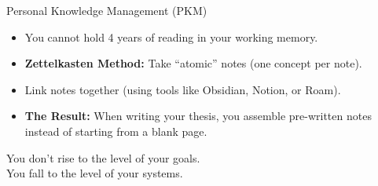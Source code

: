 \documentclass[aspectratio=169]{beamer}
\begin{document}
\begin{frame}{Personal Knowledge Management (PKM)}
  \begin{itemize}
    \item You cannot hold 4 years of reading in your working memory.
    \item \textbf{Zettelkasten Method:} Take ``atomic'' notes (one concept per note).
    \item Link notes together (using tools like Obsidian, Notion, or Roam).
    \item \textbf{The Result:} When writing your thesis, you assemble pre-written notes instead of starting from a blank page.
  \end{itemize}
\end{frame}

\begin{frame}[standout]
  You don't rise to the level of your goals.\\
  You fall to the level of your systems.
\end{frame}
\end{document}
